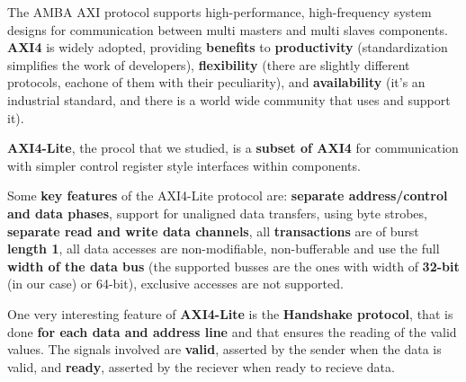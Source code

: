 {}

The AMBA AXI protocol supports high-performance, high-frequency system designs for communication between
multi masters and multi slaves components.
{\bf AXI4} is widely adopted, providing {\bf benefits} to {\bf productivity} (standardization simplifies the work of developers), {\bf flexibility} (there are slightly different protocols, eachone of them with their peculiarity), and {\bf availability} (it's an industrial standard, and there is a world wide community that uses and support it).
\newline

{\bf AXI4-Lite}, the procol that we studied, is a {\bf subset of AXI4} for communication with simpler control register style interfaces within components.
\newline

Some {\bf key features} of the AXI4-Lite protocol are: {\bf separate address/control and data phases}, support for unaligned data transfers, using byte strobes, {\bf separate read and write data channels}, all {\bf transactions} are of burst {\bf length 1}, all data accesses are non-modifiable, non-bufferable and use the full {\bf width of the data bus} (the supported busses are the ones with width of {\bf 32-bit} (in our case) or 64-bit), exclusive accesses are not supported.
\newline

One very interesting feature of {\bf AXI4-Lite} is the {\bf Handshake protocol}, that is done {\bf for each data and address line} and that ensures the reading of the valid values. The signals involved are {\bf valid}, asserted by the sender when the data is valid, and {\bf ready}, asserted by the reciever when ready to recieve data.

